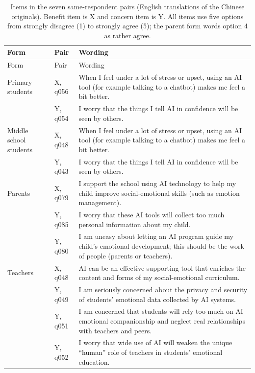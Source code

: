 \small
\setlength{\tabcolsep}{3.5pt}

\begin{longtable}{@{}p{}p{}p{}@{}}
\caption{Items in the seven same-respondent pairs (English translations of the Chinese originals). Benefit item is X and concern item is Y. All items use five options from strongly disagree (1) to strongly agree (5); the parent form words option 4 as rather agree.}\label{tab:joint_items}\\
\toprule Form & Pair & Wording \\ \midrule \endfirsthead
\toprule Form & Pair & Wording \\ \midrule \endhead
\bottomrule \endfoot
Primary students & X, q056 & When I feel under a lot of stress or upset, using an AI tool (for example talking to a chatbot) makes me feel a bit better. \\
 & Y, q054 & I worry that the things I tell AI in confidence will be seen by others. \\
Middle school students & X, q048 & When I feel under a lot of stress or upset, using an AI tool (for example talking to a chatbot) makes me feel a bit better. \\
 & Y, q043 & I worry that the things I tell AI in confidence will be seen by others. \\
Parents & X, q079 & I support the school using AI technology to help my child improve social-emotional skills (such as emotion management). \\
 & Y, q085 & I worry that these AI tools will collect too much personal information about my child. \\
 & Y, q080 & I am uneasy about letting an AI program guide my child's emotional development; this should be the work of people (parents or teachers). \\
Teachers & X, q048 & AI can be an effective supporting tool that enriches the content and forms of my social-emotional curriculum. \\
 & Y, q049 & I am seriously concerned about the privacy and security of students' emotional data collected by AI systems. \\
 & Y, q051 & I am concerned that students will rely too much on AI emotional companionship and neglect real relationships with teachers and peers. \\
 & Y, q052 & I worry that wide use of AI will weaken the unique ``human'' role of teachers in students' emotional education. \\
\end{longtable}

